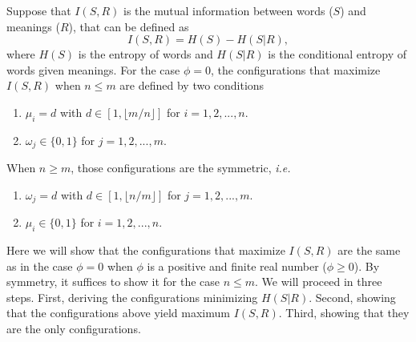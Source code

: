 \documentclass{article}
\begin{document}
Suppose that $I(S, R)$ is the mutual information between words ($S$) and meanings ($R$), that can be defined as 
\begin{equation}
I(S,R) = H(S) - H(S|R),
\label{mutual_information_equation}
\end{equation} 
where $H(S)$ is the entropy of words and $H(S|R)$ is the conditional entropy of words given meanings.
For the case $\phi = 0$, the configurations that maximize $I(S,R)$ when $n \leq m$ are defined by two conditions \cite{Ferrer2013g}
\begin{enumerate}
\item
$\mu_i = d$ with $d \in [1, \lfloor m/n \rfloor]$ for $i = 1,2,...,n$.  
\item
$\omega_j \in \{0, 1\}$ for $j = 1,2,...,m$.  
\end{enumerate}
When $n \geq m$, those configurations are the symmetric, {\em i.e.} \cite{Ferrer2013g}
\begin{enumerate}
\item
$\omega_j = d$ with $d \in [1,  \lfloor n/m \rfloor]$ for $j = 1,2,...,m$.  
\item
$\mu_i \in \{0, 1\}$ for $i = 1,2,...,n$.  
\end{enumerate}
Here we will show that the configurations that maximize $I(S, R)$ are the same as in the case $\phi = 0$ when $\phi$ is a positive and finite real number ($\phi \geq 0$). By symmetry, it suffices to show it for the case $n \leq m$. We will proceed in three steps. First, deriving the configurations minimizing $H(S|R)$.
Second, showing that the configurations above yield maximum $I(S,R)$. Third, showing that they are the only configurations.
\end{document}
